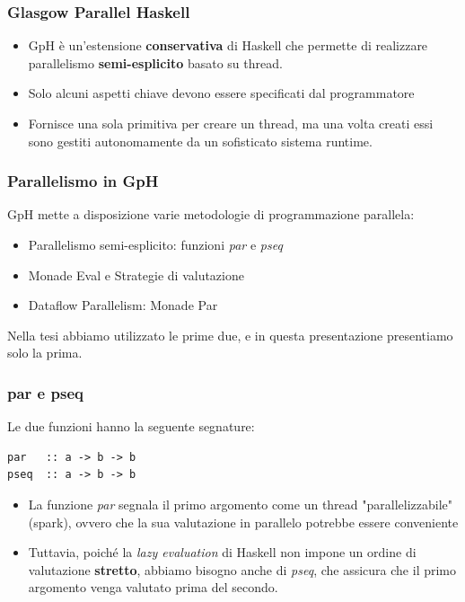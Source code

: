 \documentclass[14pt]{beamer}
\begin{document}
\begin{frame}
\frametitle{Glasgow Parallel Haskell}
\begin{itemize}
\item GpH è un'estensione \textbf{conservativa} di Haskell che permette di
  realizzare parallelismo \textbf{semi-esplicito} basato su thread.

\item Solo alcuni aspetti chiave devono essere specificati dal programmatore 
\item 
  Fornisce una sola primitiva per creare un thread, ma una volta creati essi sono gestiti autonomamente da un sofisticato sistema runtime.\\ [2ex]
\end{itemize}
\end{frame}

\begin{frame}
\frametitle{Parallelismo in GpH}
GpH mette a disposizione varie metodologie di programmazione parallela:
\begin{itemize}
\item Parallelismo semi-esplicito: funzioni \textit{par} e \textit{pseq}
\item Monade Eval e Strategie di valutazione
\item Dataflow Parallelism: Monade Par
\end{itemize}
Nella tesi abbiamo utilizzato le prime due, e in questa presentazione presentiamo solo la prima.
\end{frame}

\begin{frame}[fragile]
\frametitle{par e pseq}
Le due funzioni hanno la seguente segnature: 
\begin{verbatim}
par   :: a -> b -> b
pseq  :: a -> b -> b
\end{verbatim}
\begin{itemize}
\item La funzione
\textit{par} segnala il   primo argomento come un thread
"parallelizzabile" (spark), ovvero che la sua valutazione in parallelo
potrebbe essere conveniente
\item Tuttavia, poiché la \emph{lazy evaluation} di Haskell non impone
  un ordine di valutazione \textbf{stretto}, abbiamo bisogno anche di
  \textit{pseq}, che assicura che il primo argomento venga valutato
  prima del secondo.
\end{itemize}

\end{frame}
\end{document}
